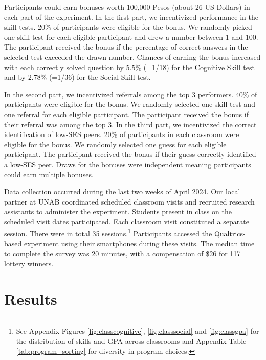 \documentclass[11pt,a4paper,oneside]{article}
\begin{document}
Participants could earn bonuses worth 100,000 Pesos (about 26 US Dollars) in each part of the experiment. In the first part, we incentivized performance in the skill tests. 20\% of participants were eligible for the bonus. We randomly picked one skill test for each eligible participant and drew a number between 1 and 100. The participant received the bonus if the percentage of correct answers in the selected test exceeded the drawn number. Chances of earning the bonus increased with each correctly solved question by 5.5\% (=1/18) for the Cognitive Skill test and by 2.78\% (=1/36) for the Social Skill test. 

In the second part, we incentivized referrals among the top 3 performers. 40\% of participants were eligible for the bonus. We randomly selected one skill test and one referral for each eligible participant. The participant received the bonus if their referral was among the top 3. In the third part, we incentivized the correct identification of low-SES peers. 20\% of participants in each classroom were eligible for the bonus. We randomly selected one guess for each eligible participant. The participant received the bonus if their guess correctly identified a low-SES peer. Draws for the bonuses were independent meaning participants could earn multiple bonuses.   

Data collection occurred during the last two weeks of April 2024. Our local partner at UNAB coordinated scheduled classroom visits and recruited research assistants to administer the experiment. Students present in class on the scheduled visit dates participated. Each classroom visit constituted a separate session. There were in total 35 sessions.\footnote{See Appendix Figures \ref{fig:classcognitive}, \ref{fig:classsocial} and \ref{fig:classgpa} for the distribution of skills and GPA across classrooms and Appendix Table \ref{tab:program_sorting} for diversity in program choices.} Participants accessed the Qualtrics-based experiment using their smartphones during these visits. The median time to complete the survey was 20 minutes, with a compensation of \$26 for 117 lottery winners.


\section{Results} \label{s5}
\end{document}
